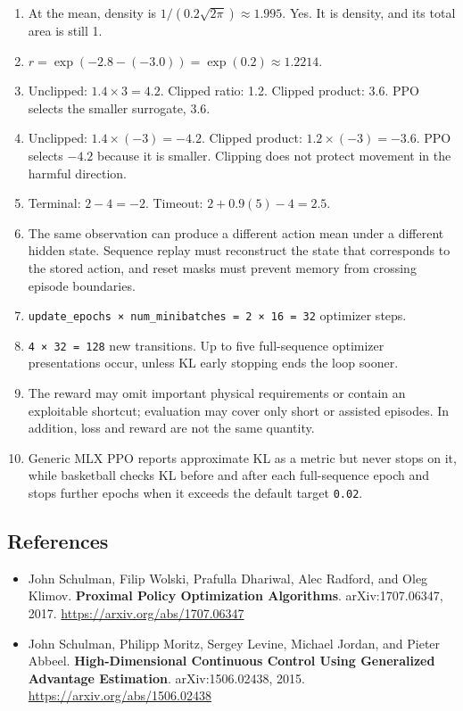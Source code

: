 \documentclass[
  american,
  11pt,
  letterpaper,
]{article}
\providecommand{\tightlist}{%
  \setlength{\itemsep}{0pt}\setlength{\parskip}{0pt}}
\begin{document}
\begin{enumerate}
\def\labelenumi{\arabic{enumi}.}
\tightlist
\item
  At the mean, density is \(1/(0.2\sqrt{2\pi})\approx1.995\). Yes. It is
  density, and its total area is still 1.
\item
  \(r=\exp(-2.8-(-3.0))=\exp(0.2)\approx1.2214\).
\item
  Unclipped: \(1.4\times3=4.2\). Clipped ratio: 1.2. Clipped product:
  3.6. PPO selects the smaller surrogate, 3.6.
\item
  Unclipped: \(1.4\times(-3)=-4.2\). Clipped product:
  \(1.2\times(-3)=-3.6\). PPO selects \(-4.2\) because it is smaller.
  Clipping does not protect movement in the harmful direction.
\item
  Terminal: \(2-4=-2\). Timeout: \(2+0.9(5)-4=2.5\).
\item
  The same observation can produce a different action mean under a
  different hidden state. Sequence replay must reconstruct the state
  that corresponds to the stored action, and reset masks must prevent
  memory from crossing episode boundaries.
\item
  \texttt{update\_epochs\ ×\ num\_minibatches\ =\ 2\ ×\ 16\ =\ 32}
  optimizer steps.
\item
  \texttt{4\ ×\ 32\ =\ 128} new transitions. Up to five full-sequence
  optimizer presentations occur, unless KL early stopping ends the loop
  sooner.
\item
  The reward may omit important physical requirements or contain an
  exploitable shortcut; evaluation may cover only short or assisted
  episodes. In addition, loss and reward are not the same quantity.
\item
  Generic MLX PPO reports approximate KL as a metric but never stops on
  it, while basketball checks KL before and after each full-sequence
  epoch and stops further epochs when it exceeds the default target
  \texttt{0.02}.
\end{enumerate}

\subsection{References}\label{references}

\begin{itemize}
\tightlist
\item
  John Schulman, Filip Wolski, Prafulla Dhariwal, Alec Radford, and Oleg
  Klimov. \textbf{Proximal Policy Optimization Algorithms}.
  arXiv:1707.06347, 2017. \url{https://arxiv.org/abs/1707.06347}
\item
  John Schulman, Philipp Moritz, Sergey Levine, Michael Jordan, and
  Pieter Abbeel. \textbf{High-Dimensional Continuous Control Using
  Generalized Advantage Estimation}. arXiv:1506.02438, 2015.
  \url{https://arxiv.org/abs/1506.02438}
\end{itemize}
\end{document}
